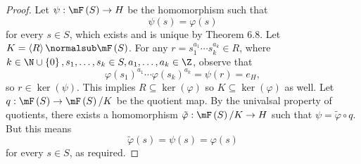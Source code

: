 \documentclass[pmath347]{subfiles}
\begin{document}
    \begin{proof}
        Let $\psi:\mF\left( S \right) \to H$ be the homomorphism such that
        \begin{equation*}
            \psi\left( s \right) = \varphi\left( s \right) 
        \end{equation*}
        for every $s\in S$, which exists and is unique by Theorem 6.8. Let $K = \left< R \right> \normalsub\mF\left( S \right)$. For any $r=s_1^{a_1}\cdots s_k^{a_k}\in R$, where $k\in\N\cup\left\lbrace 0 \right\rbrace , s_1,\ldots,s_k\in S, a_1,\ldots,a_k\in\Z$, observe that
        \begin{equation*}
            \varphi\left( s_1 \right) ^{a_1}\cdots\varphi\left( s_k \right) ^{a_k} = \psi\left( r \right) = e_H,
        \end{equation*}
        so $r\in\ker\left( \psi \right)$. This implies $R\subseteq\ker\left( \varphi \right)$ so $K\subseteq\ker\left( \varphi \right)$ as well. Let $q:\mF\left( S \right) \to \mF\left( S \right) /K$ be the quotient map. By the univalsal property of quotients, there exists a homomorphism $\tilde{\varphi} :\mF\left( S \right) /K\to H$ such that $\psi = \tilde{\varphi} \circ q$. But this means
        \begin{equation*}
            \tilde{\varphi} \left( s \right) = \psi\left( s \right) = \varphi\left( s \right) 
        \end{equation*}
        for every $s\in S$, as required.
    \end{proof}
\end{document}
